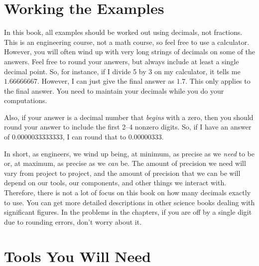 \section{Working the Examples}

In this book, all examples should be worked out using decimals, not fractions.
This is an engineering course, not a math course, so feel free to use a calculator.
However, you will often wind up with very long strings of decimals on some of the answers.
Feel free to round your answers, but always include at least a single decimal point.
So, for instance, if I divide 5 by 3 on my calculator, it tells me $1.66666667$.
However, I can just give the final answer as $1.7$.
This only applies to the final answer.  
You need to maintain your decimals while you do your computations.

Also, if your answer is a decimal number that \emph{begins} with a zero, then you should round your answer to include the first 2--4 nonzero digits.
So, if I have an answer of $0.0000033333333$, I can round that to $0.00000333$.

In short, as engineers, we wind up being, at minimum, as precise as we \emph{need} to be or, at maximum, as precise as we \emph{can} be.
The amount of precision we need will vary from project to project, and the amount of precision that we can be will depend on our tools, our components, and other things we interact with.
Therefore, there is not a lot of focus on this book on how many decimals exactly to use.
You can get more detailed descriptions in other science books dealing with significant figures.
In the problems in the chapters, if you are off by a single digit due to rounding errors, don't worry about it.

\section{Tools You Will Need}

